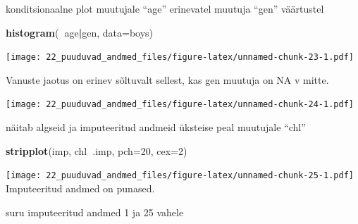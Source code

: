\documentclass[]{book}
\newenvironment{Shaded}{\begin{snugshade}}{\end{snugshade}}
\newcommand{\DataTypeTok}[1]{\textcolor[rgb]{0.13,0.29,0.53}{#1}}
\newcommand{\DecValTok}[1]{\textcolor[rgb]{0.00,0.00,0.81}{#1}}
\newcommand{\KeywordTok}[1]{\textcolor[rgb]{0.13,0.29,0.53}{\textbf{#1}}}
\newcommand{\NormalTok}[1]{#1}
\newcommand{\OperatorTok}[1]{\textcolor[rgb]{0.81,0.36,0.00}{\textbf{#1}}}
\newcommand{\OtherTok}[1]{\textcolor[rgb]{0.56,0.35,0.01}{#1}}
\newcommand{\StringTok}[1]{\textcolor[rgb]{0.31,0.60,0.02}{#1}}
\begin{document}
konditsionaalne plot muutujale ``age'' erinevatel muutuja ``gen'' väärtustel

\begin{Shaded}
\begin{Highlighting}[]
\KeywordTok{histogram}\NormalTok{(}\OperatorTok{~}\NormalTok{age}\OperatorTok{|}\NormalTok{gen, }\DataTypeTok{data=}\NormalTok{boys)}
\end{Highlighting}
\end{Shaded}

\texttt{[image: 22\_puuduvad\_andmed\_files/figure-latex/unnamed-chunk-23-1.pdf]}

Vanuste jaotus on erinev sõltuvalt sellest, kas gen muutuja on NA v mitte.

\begin{Shaded}
\end{Shaded}

\texttt{[image: 22\_puuduvad\_andmed\_files/figure-latex/unnamed-chunk-24-1.pdf]}

näitab algseid ja imputeeritud andmeid üksteise peal muutujale ``chl''

\begin{Shaded}
\begin{Highlighting}[]
\KeywordTok{stripplot}\NormalTok{(imp, chl}\OperatorTok{~}\NormalTok{.imp, }\DataTypeTok{pch=}\DecValTok{20}\NormalTok{, }\DataTypeTok{cex=}\DecValTok{2}\NormalTok{)}
\end{Highlighting}
\end{Shaded}

\texttt{[image: 22\_puuduvad\_andmed\_files/figure-latex/unnamed-chunk-25-1.pdf]}
Imputeeritud andmed on punased.

suru imputeeritud andmed 1 ja 25 vahele

\begin{Shaded}
\end{Shaded}
\end{document}
